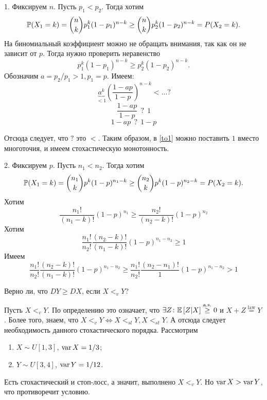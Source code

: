 \solution{}
    1. Фиксируем $n$. Пусть $p_1 < p_2$. Тогда хотим
        \begin{equation}
            \P(X_1 = k) = \binom{n}{k}p_1^k(1-p_1)^{n-k} \geq \binom{n}{k}p_2^k(1-p_2)^{n-k} = P(X_2 = k).
        \end{equation}
        На биномиальный коэффициент можно не обращать внимания, так как он не зависит от $p$. Тогда нужно проверить неравенство
        \begin{equation}
            p_1^k(1-p_1)^{n-k} \geq p_2^k(1-p_2)^{n-k}.
        \end{equation}
        Обозначим $a = p_2/p_1 > 1, p_1 = p$. Имеем:
        \begin{equation}\label{to1}
             \underbrace{a^k}_{<1} \left(\frac{1-ap}{1-p}\right)^{n-k} <...?
        \end{equation}
        \begin{equation}
            \frac{1-ap}{1-p}\ \ ?\ \ 1
        \end{equation}
        \begin{equation}
            1-ap\ \ ?\ \ 1-p
        \end{equation}

        Отсюда следует, что $?$ это $<$. 
        Таким образом, в \eqref{to1} можно поставить $1$ вместо многоточия, и имеем стохастическую монотонность.

    2. Фиксируем $p$. Пусть $n_1 < n_2$. Тогда хотим
        \begin{equation}
            \P(X_1 = k) = \binom{n_1}{k}p^k(1-p)^{n_1-k} \geq \binom{n_2}{k}p^k(1-p)^{n_2-k} = P(X_2 = k).
        \end{equation}
        Хотим \begin{equation}
            \frac{n_1!}{(n_1 - k)!}(1-p)^{n_1} \geq \frac{n_2!}{(n_2 - k)!}(1-p)^{n_2}
        \end{equation}
        Хотим \begin{equation}
            \frac{n_1!}{n_2!}\frac{(n_2 - k)!}{(n_1 - k)!}(1-p)^{n_1-n_2} \geq 1
        \end{equation}
        Имеем
        \begin{equation}
            \frac{n_1!}{n_2!}\frac{(n_2 - k)!}{(n_1 - k)!}(1-p)^{n_1-n_2} \geq \frac{n_1!}{n_2!}\frac{(n_2 - n_1)!}{1}(1-p)^{n_1-n_2} > 1
        \end{equation}

\problem{}
Верно ли, что $D Y \geq D X$, если $X <_v Y$?

\solution{}
    Пусть $X <_v Y$. По определению это означает, что $\exists Z\colon \E\left[Z|X\right] \overset{\text{a.s.}}{\geq} 0$ и $X+Z \overset{\text{law}}{=} Y$.
    Более того, знаем, что $X<_vY \iff X<_{sl}Y, X<_{st}Y$. А отсюда следует необходимость данного стохастического порядка.
    Рассмотрим\begin{enumerate}
        \item $X \sim U[1, 3]$, $\var X = 1/3$;
        \item $Y\sim U[3, 4]$, $\var Y = 1/12$.
    \end{enumerate}
    Есть стохастический и стоп-лосс, а значит, выполнено $X<_vY$. Но $\var X > \var Y$, что противоречит условию.

